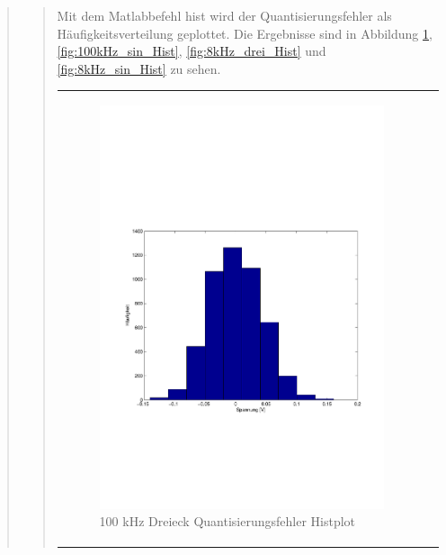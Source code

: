 \begin{quote}
\begin{quote}
        \vspace{2em}
        
        
         
        Mit dem Matlabbefehl hist wird der Quantisierungsfehler als Häufigkeitsverteilung geplottet. Die Ergebnisse sind in
        Abbildung \ref{fig:100kHz_drei_Hist}, \ref{fig:100kHz_sin_Hist}, \ref{fig:8kHz_drei_Hist} und
        \ref{fig:8kHz_sin_Hist} zu sehen.
        
        \begin{center}
            \begin{tabular}{ll}
            
            \hspace{-4cm}
                \begin{minipage}{0.6\textwidth}
                    \begin{figure}[H]
                        \includegraphics[scale=0.5, trim = 16mm 70mm 16mm 85mm, clip]
                                        {Bilder/100kHz_dreieck_Quant_Hist}
                        \caption{100 kHz Dreieck Quantisierungsfehler Histplot}
                        \label{fig:100kHz_drei_Hist}
                    \end{figure}
                \end{minipage}
                

\end{tabular}
\end{center}
\end{quote}
\end{quote}
